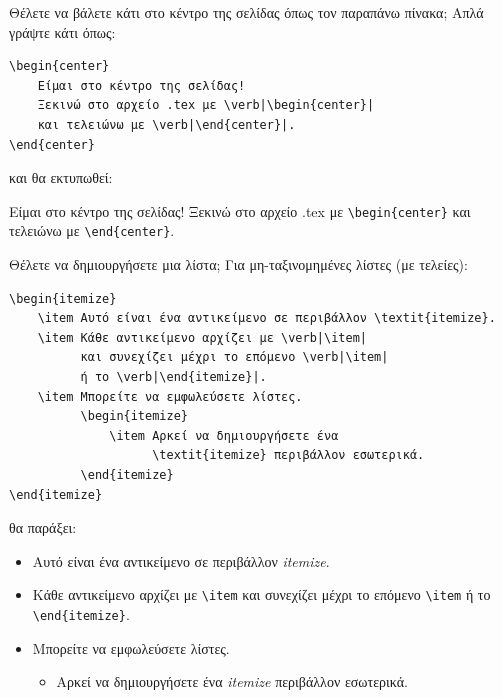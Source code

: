 \documentclass[inscr,ack,preface]{dimscthesis}
\begin{document}
Θέλετε να βάλετε κάτι στο κέντρο της σελίδας όπως τον παραπάνω πίνακα;
Απλά γράψτε κάτι όπως:
\begin{verbatim}
\begin{center}
    Είμαι στο κέντρο της σελίδας!
    Ξεκινώ στο αρχείο .tex με \verb|\begin{center}|
    και τελειώνω με \verb|\end{center}|.
\end{center}
\end{verbatim}

και θα εκτυπωθεί:

\begin{center}
    Είμαι στο κέντρο της σελίδας!
    Ξεκινώ στο αρχείο .tex με \verb|\begin{center}|
    και τελειώνω με \verb|\end{center}|.
\end{center}

Θέλετε να δημιουργήσετε μια λίστα;
Για μη-ταξινομημένες λίστες (με τελείες):
\begin{verbatim}
\begin{itemize}
    \item Αυτό είναι ένα αντικείμενο σε περιβάλλον \textit{itemize}.
    \item Κάθε αντικείμενο αρχίζει με \verb|\item|
          και συνεχίζει μέχρι το επόμενο \verb|\item|
          ή το \verb|\end{itemize}|.
    \item Μπορείτε να εμφωλεύσετε λίστες.
          \begin{itemize}
              \item Αρκεί να δημιουργήσετε ένα
                    \textit{itemize} περιβάλλον εσωτερικά.
          \end{itemize}
\end{itemize}
\end{verbatim}

θα παράξει:
\begin{itemize}
    \item Αυτό είναι ένα αντικείμενο σε περιβάλλον \textit{itemize}.
    \item Κάθε αντικείμενο αρχίζει με \verb|\item|
    και συνεχίζει μέχρι το επόμενο \verb|\item|
    ή το \verb|\end{itemize}|.
    \item Μπορείτε να εμφωλεύσετε λίστες.
    \begin{itemize}
        \item Αρκεί να δημιουργήσετε ένα
        \textit{itemize} περιβάλλον εσωτερικά.
    \end{itemize}
\end{itemize}
\end{document}
